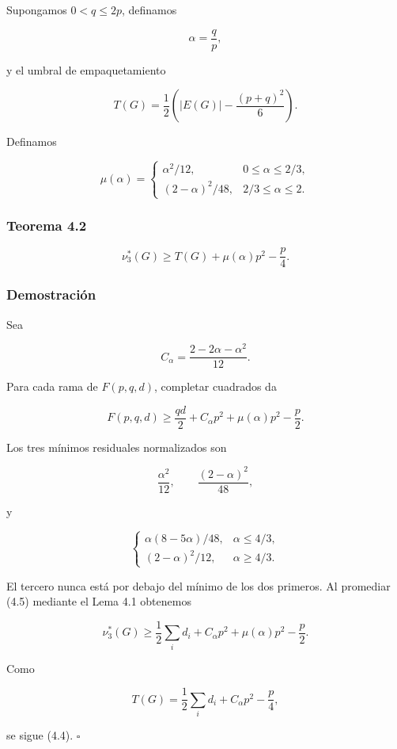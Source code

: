 \documentclass[
  11pt,
]{article}
\begin{document}
Supongamos \(0<q\le2p\), definamos

\[
\alpha=\frac qp,
\]

y el umbral de empaquetamiento

\[
T(G)=\frac12\left(|E(G)|-\frac{(p+q)^2}{6}\right).
\tag{4.2}
\]

Definamos

\[
\mu(\alpha)
=
\begin{cases}
\alpha^2/12,&0\le\alpha\le2/3,\\
(2-\alpha)^2/48,&2/3\le\alpha\le2.
\end{cases}
\tag{4.3}
\]

\subsubsection{Teorema 4.2}\label{teorema-4.2-margen-fraccionario-unificado}

\[
\boxed{
\nu_3^*(G)
\ge
T(G)+\mu(\alpha)p^2-\frac p4.
}
\tag{4.4}
\]

\subsubsection{Demostración}\label{demostraciuxf3n-2}

Sea

\[
C_\alpha=\frac{2-2\alpha-\alpha^2}{12}.
\]

Para cada rama de \(F(p,q,d)\), completar cuadrados da

\[
F(p,q,d)
\ge
\frac{qd}{2}+C_\alpha p^2+\mu(\alpha)p^2-\frac p2.
\tag{4.5}
\]

Los tres mínimos residuales normalizados son

\[
\frac{\alpha^2}{12},
\qquad
\frac{(2-\alpha)^2}{48},
\]

y

\[
\begin{cases}
\alpha(8-5\alpha)/48,&\alpha\le4/3,\\
(2-\alpha)^2/12,&\alpha\ge4/3.
\end{cases}
\]

El tercero nunca está por debajo del mínimo de los dos primeros. Al
promediar (4.5) mediante el Lema 4.1 obtenemos

\[
\nu_3^*(G)
\ge
\frac12\sum_i d_i+C_\alpha p^2+\mu(\alpha)p^2-\frac p2.
\]

Como

\[
T(G)=\frac12\sum_i d_i+C_\alpha p^2-\frac p4,
\]

se sigue (4.4). \(\square\)
\end{document}
